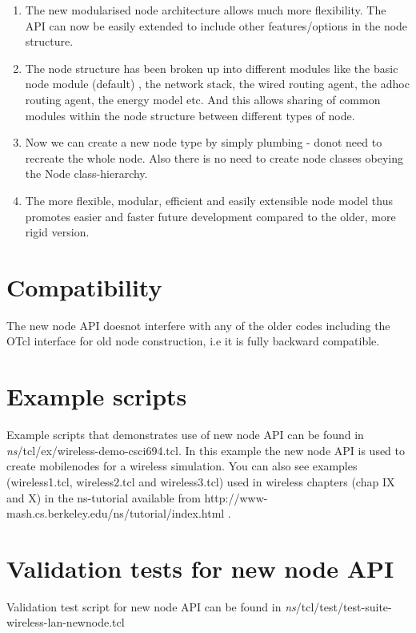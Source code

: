 \begin{enumerate}
\item
The new modularised node architecture allows much more flexibility.
The API can now be easily extended to include other features/options in the
node structure. 
\item
The node structure has been broken up into different modules like the
basic node module (default) , the network stack, the wired routing
agent, the adhoc routing agent, the energy model etc. And this allows
sharing of common modules within the node structure between different
types of node.
\item
Now we can create a new node type by simply plumbing - donot need to
recreate the whole node. Also there is no need to create node classes
obeying the Node class-hierarchy. 
\item
The more flexible, modular, efficient and easily extensible node model
thus promotes easier and faster future development compared to the older,
more rigid version.
\end{enumerate}


\section{Compatibility}
\label{sec:compat}

The new node API doesnot interfere with any of the older codes including
the OTcl interface for old node construction, i.e it is fully backward
compatible.


\section{Example scripts}
\label{sec:ex}

Example scripts that demonstrates use of new node API can be found in
\emph{ns}/tcl/ex/wireless-demo-csci694.tcl. In this example the new node API is
used to create mobilenodes for a  wireless simulation. You can also see
examples (wireless1.tcl, wireless2.tcl and wireless3.tcl) used in wireless
chapters (chap IX and X) in the ns-tutorial available from 
http://www-mash.cs.berkeley.edu/ns/tutorial/index.html .


\section{Validation tests for new node API}
\label{sec:valid-test}

Validation test script for new node API can be found in
\emph{ns}/tcl/test/test-suite-wireless-lan-newnode.tcl 


